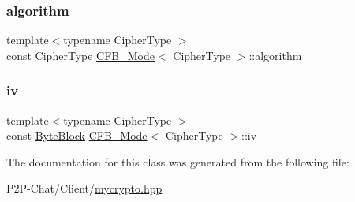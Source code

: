 \subsubsection{\texorpdfstring{algorithm}{algorithm}}
{\footnotesize\ttfamily template$<$typename Cipher\+Type $>$ \\
const Cipher\+Type \hyperlink{class_c_f_b___mode}{C\+F\+B\+\_\+\+Mode}$<$ Cipher\+Type $>$\+::algorithm\hspace{0.3cm}{\ttfamily [private]}}

\mbox{\label{class_c_f_b___mode_a894c65328ecaf2095dd283bc263620fe}} 
\subsubsection{\texorpdfstring{iv}{iv}}
{\footnotesize\ttfamily template$<$typename Cipher\+Type $>$ \\
const \hyperlink{class_byte_block}{Byte\+Block} \hyperlink{class_c_f_b___mode}{C\+F\+B\+\_\+\+Mode}$<$ Cipher\+Type $>$\+::iv\hspace{0.3cm}{\ttfamily [private]}}



The documentation for this class was generated from the following file\+:\begin{DoxyCompactItemize}
\item 
P2\+P-\/\+Chat/\+Client/\hyperlink{mycrypto_8hpp}{mycrypto.\+hpp}\end{DoxyCompactItemize}
